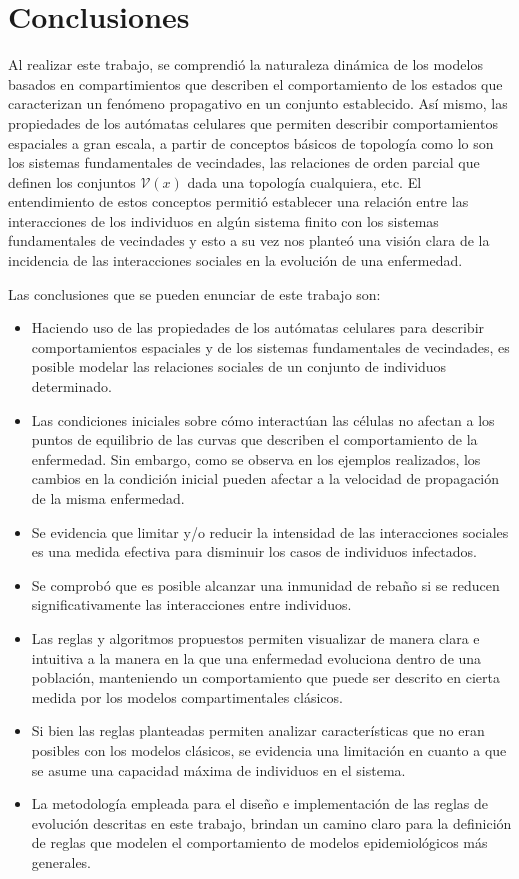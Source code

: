 \chapter{Conclusiones}

Al realizar este trabajo, se comprendió la naturaleza dinámica de los modelos basados en compartimientos que describen el comportamiento de los estados que caracterizan un fenómeno propagativo en un conjunto establecido. Así mismo, las propiedades de los autómatas celulares que permiten describir comportamientos espaciales a gran escala, a partir de conceptos básicos de topología como lo son los sistemas fundamentales de vecindades, las relaciones de orden parcial que definen los conjuntos $\mathcal{V}(x)$ dada una topología cualquiera, etc. El entendimiento de estos conceptos permitió establecer una relación entre las interacciones de los individuos en algún sistema finito con los sistemas fundamentales de vecindades y esto a su vez nos planteó una visión clara de la incidencia de las interacciones sociales en la evolución de una enfermedad.

Las conclusiones que se pueden enunciar de este trabajo son:
\begin{itemize}
    \item Haciendo uso de las propiedades de los autómatas celulares para describir comportamientos espaciales y de los sistemas fundamentales de vecindades, es posible modelar las relaciones sociales de un conjunto de individuos determinado.
    \item Las condiciones iniciales sobre cómo interactúan las células no afectan a los puntos de equilibrio de las curvas que describen el comportamiento de la enfermedad. Sin embargo, como se observa en los ejemplos realizados, los cambios en la condición inicial pueden afectar a la velocidad de propagación de la misma enfermedad.
    \item Se evidencia que limitar y/o reducir la intensidad de las interacciones sociales es una medida efectiva para disminuir los casos de individuos infectados.
    \item Se comprobó que es posible alcanzar una inmunidad de rebaño si se reducen significativamente las interacciones entre individuos.
    \item Las reglas y algoritmos propuestos permiten visualizar de manera clara e intuitiva a la manera en la que una enfermedad evoluciona dentro de una población, manteniendo un comportamiento que puede ser descrito en cierta medida por los modelos compartimentales clásicos.
    \item Si bien las reglas planteadas permiten analizar características que no eran posibles con los modelos clásicos, se evidencia una limitación en cuanto a que se asume una capacidad máxima de individuos en el sistema.
    \item La metodología empleada para el diseño e implementación de las reglas de evolución descritas en este trabajo, brindan un camino claro para la definición de reglas que modelen el comportamiento de modelos epidemiológicos más generales.
\end{itemize}